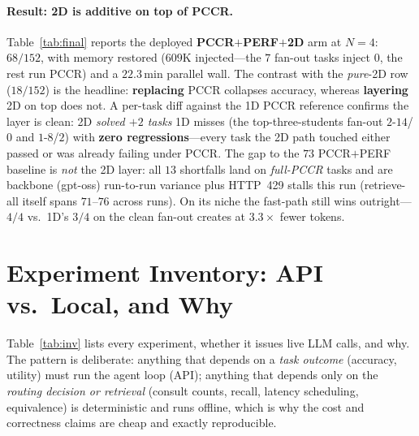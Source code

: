 \documentclass[10pt,twocolumn]{article}
\begin{document}
\paragraph{Result: 2D is additive on top of PCCR.} Table~\ref{tab:final} reports the deployed
\textbf{PCCR$+$PERF$+$2D} arm at $N{=}4$: $68/152$, with memory restored ($609$K injected---the $7$
fan-out tasks inject $0$, the rest run PCCR) and a $22.3$\,min parallel wall. The contrast with the
\emph{pure}-2D row ($18/152$) is the headline: \textbf{replacing} PCCR collapses accuracy, whereas
\textbf{layering} 2D on top does not. A per-task diff against the 1D PCCR reference confirms the layer
is clean: 2D \emph{solved $+2$ tasks} 1D misses (the top-three-students fan-out $2$-$14$/$0$ and
$1$-$8$/$2$) with \textbf{zero regressions}---every task the 2D path touched either passed or was
already failing under PCCR. The gap to the $73$ PCCR$+$PERF baseline is \emph{not} the 2D layer: all
$13$ shortfalls land on \emph{full-PCCR} tasks and are backbone (gpt-oss) run-to-run variance plus
HTTP~429 stalls this run (retrieve-all itself spans $71$--$76$ across runs). On its niche the fast-path
still wins outright---$4/4$ vs.\ 1D's $3/4$ on the clean fan-out creates at $3.3\times$ fewer tokens.

\section{Experiment Inventory: API vs.\ Local, and Why}\label{sec:inventory}
Table~\ref{tab:inv} lists every experiment, whether it issues live LLM calls, and
why. The pattern is deliberate: anything that depends on a \emph{task outcome}
(accuracy, utility) must run the agent loop (API); anything that depends only on
the \emph{routing decision or retrieval} (consult counts, recall, latency
scheduling, equivalence) is deterministic and runs offline, which is why the cost
and correctness claims are cheap and exactly reproducible.
\end{document}
